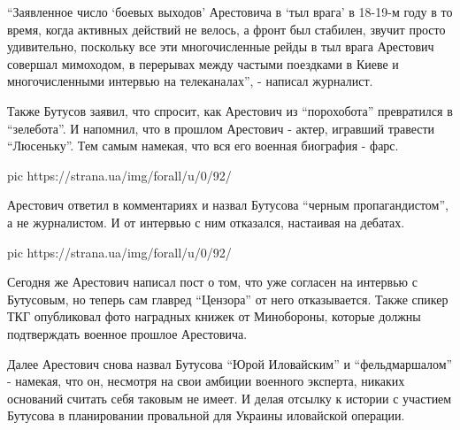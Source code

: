 \enquote{Заявленное число \enquote{боевых выходов} Арестовича в \enquote{тыл врага} в 18-19-м году
в то время, когда активных действий не велось, а фронт был стабилен,
звучит просто удивительно, поскольку все эти многочисленные рейды в тыл
врага Арестович совершал мимоходом, в перерывах между частыми поездками в
Киеве и многочисленными интервью на телеканалах}, - написал журналист. 

Также Бутусов заявил, что спросит, как Арестович из \enquote{порохобота}
превратился в \enquote{зелебота}. И напомнил, что в прошлом Арестович - актер,
игравший травести \enquote{Люсеньку}. Тем самым намекая, что вся его военная
биография - фарс. 

\ifcmt
pic https://strana.ua/img/forall/u/0/92/%
\fi

Арестович ответил в комментариях и назвал Бутусова \enquote{черным
пропагандистом}, а не журналистом. И от интервью с ним отказался,
настаивая на дебатах.

\ifcmt
pic https://strana.ua/img/forall/u/0/92/%
\fi

Сегодня же Арестович написал пост о том, что уже согласен на интервью с
Бутусовым, но теперь сам главред \enquote{Цензора} от него отказывается. Также
спикер ТКГ опубликовал фото наградных книжек от Минобороны, которые должны
подтверждать военное прошлое Арестовича. 

Далее Арестович снова назвал Бутусова \enquote{Юрой Иловайским} и \enquote{фельдмаршалом}
- намекая, что он, несмотря на свои амбиции военного эксперта, никаких
оснований считать себя таковым не имеет. И делая отсылку к истории с
участием Бутусова в планировании провальной для Украины иловайской
операции.

